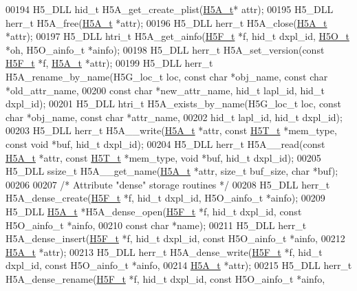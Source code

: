 \begin{DoxyCode}
00194 H5\_DLL hid\_t H5A\_get\_create\_plist(\hyperlink{struct_h5_a__t}{H5A\_t}* attr);
00195 H5\_DLL herr\_t H5A\_free(\hyperlink{struct_h5_a__t}{H5A\_t} *attr);
00196 H5\_DLL herr\_t H5A\_close(\hyperlink{struct_h5_a__t}{H5A\_t} *attr);
00197 H5\_DLL htri\_t H5A\_get\_ainfo(\hyperlink{struct_h5_f__t}{H5F\_t} *f, hid\_t dxpl\_id, \hyperlink{struct_h5_o__t}{H5O\_t} *oh, H5O\_ainfo\_t *ainfo);
00198 H5\_DLL herr\_t H5A\_set\_version(\textcolor{keyword}{const} \hyperlink{struct_h5_f__t}{H5F\_t} *f, \hyperlink{struct_h5_a__t}{H5A\_t} *attr);
00199 H5\_DLL herr\_t H5A\_rename\_by\_name(H5G\_loc\_t loc, \textcolor{keyword}{const} \textcolor{keywordtype}{char} *obj\_name, \textcolor{keyword}{const} \textcolor{keywordtype}{char} *old\_attr\_name,
00200     \textcolor{keyword}{const} \textcolor{keywordtype}{char} *new\_attr\_name, hid\_t lapl\_id, hid\_t dxpl\_id);
00201 H5\_DLL htri\_t H5A\_exists\_by\_name(H5G\_loc\_t loc, \textcolor{keyword}{const} \textcolor{keywordtype}{char} *obj\_name, \textcolor{keyword}{const} \textcolor{keywordtype}{char} *attr\_name,
00202     hid\_t lapl\_id, hid\_t dxpl\_id);
00203 H5\_DLL herr\_t H5A\_\_write(\hyperlink{struct_h5_a__t}{H5A\_t} *attr, \textcolor{keyword}{const} \hyperlink{struct_h5_t__t}{H5T\_t} *mem\_type, \textcolor{keyword}{const} \textcolor{keywordtype}{void} *buf, hid\_t dxpl\_id);
00204 H5\_DLL herr\_t H5A\_\_read(\textcolor{keyword}{const} \hyperlink{struct_h5_a__t}{H5A\_t} *attr, \textcolor{keyword}{const} \hyperlink{struct_h5_t__t}{H5T\_t} *mem\_type, \textcolor{keywordtype}{void} *buf, hid\_t dxpl\_id);
00205 H5\_DLL ssize\_t H5A\_\_get\_name(\hyperlink{struct_h5_a__t}{H5A\_t} *attr, \textcolor{keywordtype}{size\_t} buf\_size, \textcolor{keywordtype}{char} *buf);
00206 
00207 \textcolor{comment}{/* Attribute "dense" storage routines */}
00208 H5\_DLL herr\_t H5A\_dense\_create(\hyperlink{struct_h5_f__t}{H5F\_t} *f, hid\_t dxpl\_id, H5O\_ainfo\_t *ainfo);
00209 H5\_DLL \hyperlink{struct_h5_a__t}{H5A\_t} *H5A\_dense\_open(\hyperlink{struct_h5_f__t}{H5F\_t} *f, hid\_t dxpl\_id, \textcolor{keyword}{const} H5O\_ainfo\_t *ainfo,
00210     \textcolor{keyword}{const} \textcolor{keywordtype}{char} *name);
00211 H5\_DLL herr\_t H5A\_dense\_insert(\hyperlink{struct_h5_f__t}{H5F\_t} *f, hid\_t dxpl\_id, \textcolor{keyword}{const} H5O\_ainfo\_t *ainfo,
00212     \hyperlink{struct_h5_a__t}{H5A\_t} *attr);
00213 H5\_DLL herr\_t H5A\_dense\_write(\hyperlink{struct_h5_f__t}{H5F\_t} *f, hid\_t dxpl\_id, \textcolor{keyword}{const} H5O\_ainfo\_t *ainfo,
00214     \hyperlink{struct_h5_a__t}{H5A\_t} *attr);
00215 H5\_DLL herr\_t H5A\_dense\_rename(\hyperlink{struct_h5_f__t}{H5F\_t} *f, hid\_t dxpl\_id, \textcolor{keyword}{const} H5O\_ainfo\_t *ainfo,

\end{DoxyCode}
